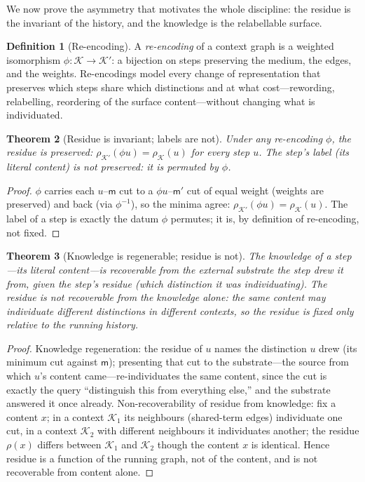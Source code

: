 \documentclass[11pt,a4paper]{article}
\theoremstyle{thmstyle}
\newtheorem{theorem}{Theorem}[section]
\theoremstyle{definition}
\newtheorem{definition}[theorem]{Definition}
\theoremstyle{remark}
\newcommand{\Ctx}{\mathcal{K}}          %
\newcommand{\med}{\mathsf{m}}           %
\newcommand{\res}{\rho}                 %
\begin{document}
We now prove the asymmetry that motivates the whole discipline: the residue is
the invariant of the history, and the knowledge is the relabellable surface.

\begin{definition}[Re-encoding]
\label{def:reencode}
A \emph{re-encoding} of a context graph is a weighted isomorphism
$\phi\colon\Ctx\to\Ctx'$: a bijection on steps preserving the medium, the edges,
and the weights. Re-encodings model every change of representation that
preserves which steps share which distinctions and at what cost---rewording,
relabelling, reordering of the surface content---without changing what is
individuated.
\end{definition}

\begin{theorem}[Residue is invariant; labels are not]
\label{thm:invariant}
Under any re-encoding $\phi$, the residue is preserved:
$\res_{\Ctx'}(\phi u)=\res_\Ctx(u)$ for every step $u$. The step's label
(its literal content) is not preserved: it is permuted by $\phi$.
\end{theorem}

\begin{proof}
$\phi$ carries each $u$--$\med$ cut to a $\phi u$--$\med'$ cut of equal weight
(weights are preserved) and back (via $\phi^{-1}$), so the minima agree:
$\res_{\Ctx'}(\phi u)=\res_\Ctx(u)$. The label of a step is exactly the datum
$\phi$ permutes; it is, by definition of re-encoding, not fixed.
\end{proof}

\begin{theorem}[Knowledge is regenerable; residue is not]
\label{thm:regenerable}
The knowledge of a step---its literal content---is recoverable from the external
substrate the step drew it from, given the step's residue (which distinction it
was individuating). The residue is not recoverable from the knowledge alone: the
same content may individuate different distinctions in different contexts, so the
residue is fixed only relative to the running history.
\end{theorem}

\begin{proof}
Knowledge regeneration: the residue of $u$ names the distinction $u$ drew (its
minimum cut against $\med$); presenting that cut to the substrate---the source
from which $u$'s content came---re-individuates the same content, since the cut
is exactly the query ``distinguish this from everything else,'' and the substrate
answered it once already. Non-recoverability of residue from knowledge: fix a
content $x$; in a context $\Ctx_1$ its neighbours (shared-term edges) individuate
one cut, in a context $\Ctx_2$ with different neighbours it individuates another;
the residue $\res(x)$ differs between $\Ctx_1$ and $\Ctx_2$ though the content
$x$ is identical. Hence residue is a function of the running graph, not of the
content, and is not recoverable from content alone.
\end{proof}
\end{document}
